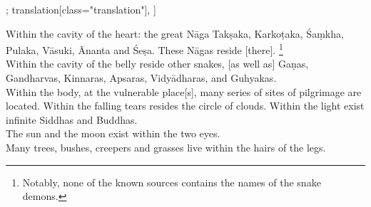 \begin{alignment}[
  texts=edition[class="edition"];
  translation[class="translation"],
  ]
\begin{translation}
\begin{tlate}
Within the cavity of the heart: the great Nāga Takṣaka, Karkoṭaka, Śaṃkha, Pulaka, Vāsuki, Ānanta and Śeṣa. These Nāgas reside [there]. \footnote{Notably, none of the known sources contains the names of the snake demons.}\\

Within the cavity of the belly reside other snakes, [as well as] Gaṇas, Gandharvas, Kinnaras, Apsaras, Vidyādharas, and Guhyakas.\\

Within the body, at the vulnerable place[s], many series of sites of pilgrimage are located. Within the falling tears resides the circle of clouds. Within the light exist infinite Siddhas and Buddhas.\\

The sun and the moon exist within the two eyes.\\

Many trees, bushes, creepers and grasses live within the hairs of the legs. \\
\clearpage
    \end{tlate}
  \end{translation}
\end{alignment}
\pagebreak %
